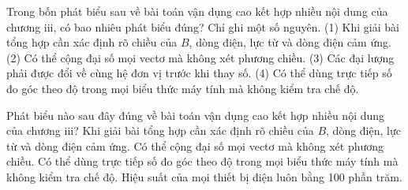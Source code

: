 \begin{ex}
Trong bốn phát biểu sau về bài toán vận dụng cao kết hợp nhiều nội dung của chương iii, có bao nhiêu phát biểu đúng? Chỉ ghi một số nguyên. (1) Khi giải bài tổng hợp cần xác định rõ chiều của $B$, dòng điện, lực từ và dòng điện cảm ứng. (2) Có thể cộng đại số mọi vectơ mà không xét phương chiều. (3) Các đại lượng phải được đổi về cùng hệ đơn vị trước khi thay số. (4) Có thể dùng trực tiếp số đo góc theo độ trong mọi biểu thức máy tính mà không kiểm tra chế độ.
\end{ex}

\begin{ex}
Phát biểu nào sau đây đúng về bài toán vận dụng cao kết hợp nhiều nội dung của chương iii?
\choice
{\True Khi giải bài tổng hợp cần xác định rõ chiều của $B$, dòng điện, lực từ và dòng điện cảm ứng.}
{Có thể cộng đại số mọi vectơ mà không xét phương chiều.}
{Có thể dùng trực tiếp số đo góc theo độ trong mọi biểu thức máy tính mà không kiểm tra chế độ.}
{Hiệu suất của mọi thiết bị điện luôn bằng 100 phần trăm.}
\end{ex}


